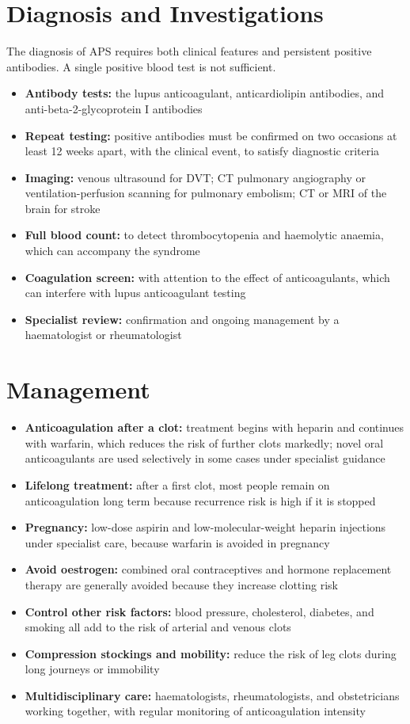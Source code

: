 \section*{Diagnosis and Investigations}
The diagnosis of APS requires both clinical features and persistent positive antibodies. A single positive blood test is not sufficient.

\begin{itemize}
    \item \textbf{Antibody tests:} the lupus anticoagulant, anticardiolipin antibodies, and anti-beta-2-glycoprotein I antibodies
    \item \textbf{Repeat testing:} positive antibodies must be confirmed on two occasions at least 12 weeks apart, with the clinical event, to satisfy diagnostic criteria
    \item \textbf{Imaging:} venous ultrasound for DVT; CT pulmonary angiography or ventilation-perfusion scanning for pulmonary embolism; CT or MRI of the brain for stroke
    \item \textbf{Full blood count:} to detect thrombocytopenia and haemolytic anaemia, which can accompany the syndrome
    \item \textbf{Coagulation screen:} with attention to the effect of anticoagulants, which can interfere with lupus anticoagulant testing
    \item \textbf{Specialist review:} confirmation and ongoing management by a haematologist or rheumatologist
\end{itemize}

\section*{Management}
\begin{itemize}
    \item \textbf{Anticoagulation after a clot:} treatment begins with heparin and continues with warfarin, which reduces the risk of further clots markedly; novel oral anticoagulants are used selectively in some cases under specialist guidance
    \item \textbf{Lifelong treatment:} after a first clot, most people remain on anticoagulation long term because recurrence risk is high if it is stopped
    \item \textbf{Pregnancy:} low-dose aspirin and low-molecular-weight heparin injections under specialist care, because warfarin is avoided in pregnancy
    \item \textbf{Avoid oestrogen:} combined oral contraceptives and hormone replacement therapy are generally avoided because they increase clotting risk
    \item \textbf{Control other risk factors:} blood pressure, cholesterol, diabetes, and smoking all add to the risk of arterial and venous clots
    \item \textbf{Compression stockings and mobility:} reduce the risk of leg clots during long journeys or immobility
    \item \textbf{Multidisciplinary care:} haematologists, rheumatologists, and obstetricians working together, with regular monitoring of anticoagulation intensity
\end{itemize}

